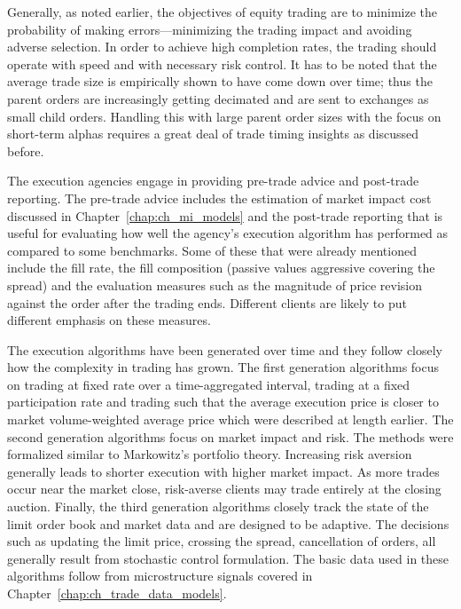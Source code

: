 Generally, as noted earlier, the objectives of equity trading are to minimize the probability of making errors---minimizing the trading impact and avoiding adverse selection. In order to achieve high completion rates, the trading should operate with speed and with necessary risk control. It has to be noted that the average trade size is empirically shown to have come down over time; thus the parent orders are increasingly getting decimated and are sent to exchanges as small child orders. Handling this with large parent order sizes with the focus on short-term alphas requires a great deal of trade timing insights as discussed before.


The execution agencies engage in providing pre-trade advice and post-trade reporting. The pre-trade advice includes the estimation of market impact cost discussed in Chapter~\ref{chap:ch_mi_models} and the post-trade reporting that is useful for evaluating how well the agency's execution algorithm has performed as compared to some benchmarks. Some of these that were already mentioned include the fill rate, the fill composition (passive values aggressive covering the spread) and the evaluation measures such as the magnitude of price revision against the order after the trading ends. Different clients are likely to put different emphasis on these measures. 


The execution algorithms have been generated over time and they follow closely how the complexity in trading has grown. The first generation algorithms focus on trading at fixed rate over a time-aggregated interval, trading at a fixed participation rate and trading such that the average execution price is closer to market volume-weighted average price which were described at length earlier. The second generation algorithms focus on market impact and risk. The methods were formalized similar to Markowitz's portfolio theory. Increasing risk aversion generally leads to shorter execution with higher market impact. As more trades occur near the market close, risk-averse clients may trade entirely at the closing auction. Finally, the third generation algorithms closely track the state of the limit order book and market data and are designed to be adaptive. The decisions such as updating the limit price, crossing the spread, cancellation of orders, all generally result from stochastic control formulation. The basic data used in these algorithms follow from microstructure signals covered in Chapter~\ref{chap:ch_trade_data_models}. \twomedskip


